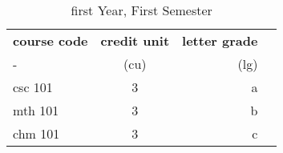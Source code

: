 \documentclass{article}
\begin{document}
	\begin{table}[h!]
		\begin{center}
			\caption{first Year, First Semester}
			\label{tab:table1}
			\begin{tabular}{l|c|r|c}
					\textbf{course code} & \textbf{credit unit} & \textbf{letter grade}\\
					 - & (cu) & (lg) \\
				\hline
				csc 101 & 3 & a\\
				mth 101 & 3 & b\\
				chm 101 & 3 & c\\
			\end{tabular}
		\end{center}
	\end{table}
\end{document}
